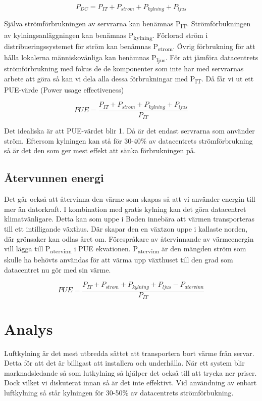 \documentclass[conference,a4paper]{IEEEtran}
\begin{document}
\[P_{DC} = P_{IT} + P_{strom} + P_{kylning} + P_{ljus} \]

Själva strömförbrukningen av servrarna kan benämnas P\textsubscript{IT}. Strömförbukningen av kylningsanläggningen 
kan benämnas P\textsubscript{kylning}. Förlorad ström i distribueringssystemet för ström kan benämnas P\textsubscript{strom}. 
Övrig förbrukning för att hålla lokalerna människovänliga kan benämnas P\textsubscript{ljus}. 
\newline\newline
För att jämföra datacentrets strömförbrukning med fokus de de komponenter som inte har med servrarnas arbete
att göra så kan vi dela alla dessa förbrukningar med P\textsubscript{IT}. Då får vi ut ett PUE-värde (Power usage effectiveness) \cite{modelling1}

\[PUE = \frac{P_{IT} + P_{strom} + P_{kylning} + P_{ljus}}{P_{IT}} \]

Det idealiska är att PUE-värdet blir 1. Då är det endast servrarna som använder ström. Eftersom kylningen kan stå för 30-40\%
av datacentrets strömförbrukning så är det den som ger mest effekt att sänka förbrukningen på. \cite{modelling2}\cite{energy3}
\subsection{Återvunnen energi}
Det går också att återvinna den värme som skapas så att vi använder energin till mer än datorkraft. I kombination med gratis kylning
kan det göra datacentret klimatvänligare. Detta kan som uppe i Boden innebära att värmen transporteras till ett intilligande växthus. 
Där skapar den en växtzon uppe i kallaste norden, där grönsaker kan odlas året om.\cite{free-cooling1} Förespråkare av återvinnande av 
värmeenergin vill lägga till P\textsubscript{atervinn} i PUE ekvationen. P\textsubscript{atervinn} är den mängden ström 
som skulle ha behövts användas för att värma upp växthuset till den grad som datacentret nu gör med sin värme.

\[PUE = \frac{P_{IT} + P_{strom} + P_{kylning} + P_{ljus} - P_{atervinn}}{P_{IT}} \]  
\newline
\section{Analys}
Luftkylning är det mest utbredda sättet att transportera bort värme från servar. Detta för att det är billigast att installera
och underhålla. När ett system blir marknadsledande så som lutkylning så hjälper det också till att trycka ner priser. Dock vilket 
vi diskuterat innan så är det inte effektivt. Vid användning av enbart luftkylning så står kylningen för 30-50\% av datacentrets 
strömförbukning. 
\end{document}
